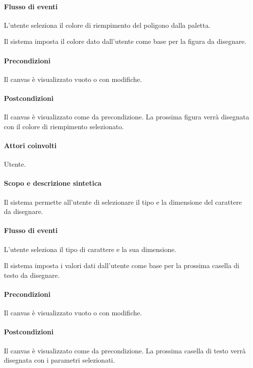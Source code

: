 \paragraph{Flusso di eventi}
\begin{elenconumerato}[\textbf{}]{\subsubsecindent}
\item L'utente seleziona il colore di riempimento del poligono dalla paletta.
\item Il sistema imposta il colore dato dall'utente come base per la figura da disegnare.
\end{elenconumerato}
\paragraph{Precondizioni} Il canvas \`e visualizzato vuoto o con modifiche.
\paragraph{Postcondizioni} Il canvas \`e visualizzato come da precondizione. La prossima figura verr\` a disegnata con il colore di riempimento selezionato.

\paragraph{Attori coinvolti} Utente.
\paragraph{Scopo e descrizione sintetica} 
Il sistema permette all'utente di selezionare il tipo e la dimensione del carattere da disegnare.
\paragraph{Flusso di eventi}
\begin{elenconumerato}[\textbf{}]{\subsubsecindent}
\item L'utente seleziona il tipo di carattere e la sua dimensione.
\item Il sistema imposta i valori dati dall'utente come base per la prossima casella di testo da disegnare.
\end{elenconumerato}
\paragraph{Precondizioni} Il canvas \`e visualizzato vuoto o con modifiche.
\paragraph{Postcondizioni} Il canvas \`e visualizzato come da precondizione. La prossima casella di testo verr\` a disegnata con i parametri selezionati.

